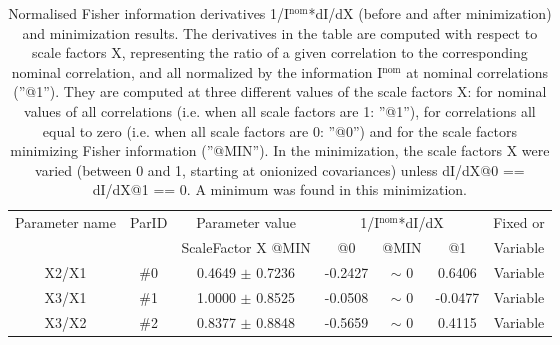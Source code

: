 \begin{table}[H]
\scriptsize
\begin{center}
\renewcommand{\arraystretch}{1.1}
\begin{tabular}{|c|c|c|ccc|c|}
\hline
Parameter name & ParID & Parameter value &\multicolumn{3}{|c|}{1/I$^\mathrm{nom}$*dI/dX} & Fixed or\\
 & & ScaleFactor X @MIN & @0 & @MIN & @1 & Variable\\
\hline
 {\tiny X2/X1} & \#0 &    0.4649 $\pm$    0.7236 &   -0.2427 & {\tiny $\sim$ }0 &    0.6406 & Variable \\
 {\tiny X3/X1} & \#1 &    1.0000 $\pm$    0.8525 &   -0.0508 & {\tiny $\sim$ }0 &   -0.0477 & Variable \\
 {\tiny X3/X2} & \#2 &    0.8377 $\pm$    0.8848 &   -0.5659 & {\tiny $\sim$ }0 &    0.4115 & Variable \\
\hline
\end{tabular}
\renewcommand{\arraystretch}{1}
\caption{Normalised Fisher information derivatives 1/I$^\mathrm{nom}$*dI/dX (before and after minimization) and minimization results.  The derivatives in the table are computed with respect to scale factors X, representing the ratio of a given correlation to the corresponding nominal correlation, and all normalized by the information I$^\mathrm{nom}$ at nominal correlations (''@1''). They are computed at three different values of the scale factors X: for nominal values of all correlations (i.e. when all scale factors are 1: ''@1''), for correlations all equal to zero (i.e. when all scale factors are 0: ''@0'') and for the scale factors minimizing Fisher information (''@MIN''). In the minimization, the scale factors X were varied (between 0 and 1, starting at onionized covariances) unless dI/dX@0 == dI/dX@1 == 0. A minimum was found in this minimization.}
\end{center}
\end{table}
